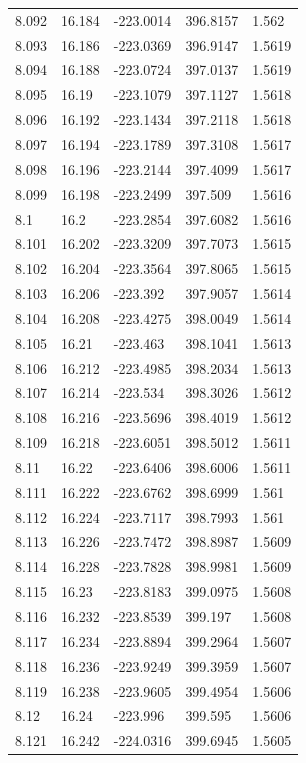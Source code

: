 \begin{tabular}{lllll}
8.092 & 16.184 & -223.0014 & 396.8157 & 1.562 \\
8.093 & 16.186 & -223.0369 & 396.9147 & 1.5619 \\
8.094 & 16.188 & -223.0724 & 397.0137 & 1.5619 \\
8.095 & 16.19 & -223.1079 & 397.1127 & 1.5618 \\
8.096 & 16.192 & -223.1434 & 397.2118 & 1.5618 \\
8.097 & 16.194 & -223.1789 & 397.3108 & 1.5617 \\
8.098 & 16.196 & -223.2144 & 397.4099 & 1.5617 \\
8.099 & 16.198 & -223.2499 & 397.509 & 1.5616 \\
8.1 & 16.2 & -223.2854 & 397.6082 & 1.5616 \\
8.101 & 16.202 & -223.3209 & 397.7073 & 1.5615 \\
8.102 & 16.204 & -223.3564 & 397.8065 & 1.5615 \\
8.103 & 16.206 & -223.392 & 397.9057 & 1.5614 \\
8.104 & 16.208 & -223.4275 & 398.0049 & 1.5614 \\
8.105 & 16.21 & -223.463 & 398.1041 & 1.5613 \\
8.106 & 16.212 & -223.4985 & 398.2034 & 1.5613 \\
8.107 & 16.214 & -223.534 & 398.3026 & 1.5612 \\
8.108 & 16.216 & -223.5696 & 398.4019 & 1.5612 \\
8.109 & 16.218 & -223.6051 & 398.5012 & 1.5611 \\
8.11 & 16.22 & -223.6406 & 398.6006 & 1.5611 \\
8.111 & 16.222 & -223.6762 & 398.6999 & 1.561 \\
8.112 & 16.224 & -223.7117 & 398.7993 & 1.561 \\
8.113 & 16.226 & -223.7472 & 398.8987 & 1.5609 \\
8.114 & 16.228 & -223.7828 & 398.9981 & 1.5609 \\
8.115 & 16.23 & -223.8183 & 399.0975 & 1.5608 \\
8.116 & 16.232 & -223.8539 & 399.197 & 1.5608 \\
8.117 & 16.234 & -223.8894 & 399.2964 & 1.5607 \\
8.118 & 16.236 & -223.9249 & 399.3959 & 1.5607 \\
8.119 & 16.238 & -223.9605 & 399.4954 & 1.5606 \\
8.12 & 16.24 & -223.996 & 399.595 & 1.5606 \\
8.121 & 16.242 & -224.0316 & 399.6945 & 1.5605 \\

\end{tabular}
